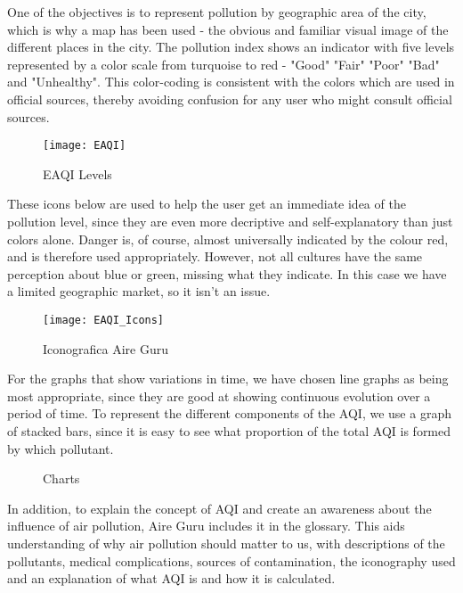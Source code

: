 One of the objectives is to represent pollution by geographic area of the city, which is why a map has been used - the 
obvious and familiar visual image of the different places in the city. The pollution index shows an indicator with 
five levels represented by a color scale from turquoise to red - "Good" "Fair" "Poor" "Bad" and "Unhealthy". 
This color-coding is consistent with the colors which are used in official sources, thereby avoiding confusion for any 
user who might consult official sources.

\begin{figure}[ht]
    \centering
    \texttt{[image: EAQI]}
    \caption{EAQI Levels}
\end{figure}

These icons below are used to help the user get an immediate idea of the pollution level, since they are even more
decriptive and self-explanatory than just colors alone. Danger is, of course, almost universally indicated by 
the colour red, and is therefore used appropriately. However, not all cultures have the same perception about
blue or green, missing what they indicate. In this case we have a limited geographic market, so it isn't an issue.\\

\begin{figure}[ht]
    \centering
    \texttt{[image: EAQI\_Icons]}
    \caption{Iconografica Aire Guru}
\end{figure}

For the graphs that show variations in time, we have chosen line graphs as being most appropriate,
since they are good at showing continuous evolution over a period of time. To represent the different components of the AQI, we use a
graph of stacked bars, since it is easy to see what proportion of the total AQI is formed by which pollutant. \\

\begin{figure}[ht]
    \centering
        \hfill
    \caption{Charts}
\end{figure}

In addition, to explain the concept of AQI and create an awareness about the influence of air pollution, Aire Guru includes it in the
glossary. This aids understanding of why air pollution should matter to us, with descriptions of the pollutants, medical complications, sources of contamination, the iconography used and
an explanation of what AQI is and how it is calculated. \\